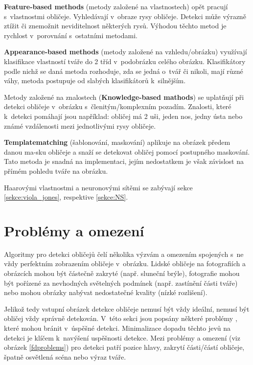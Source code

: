 \textbf{Feature-based methods} (metody založené na vlastnostech) opět pracují s~vlastnostmi obličeje. Vyhledávají v~obraze rysy obličeje. Detekci může výrazně ztížit či znemožnit neviditelnost některých rysů. Výhodou těchto metod je rychlost v~porovnání s~ostatními metodami.

\textbf{Appearance-based methods} (metody založené na vzhledu/obrázku) využívají klasifikace vlastností tváře do 2 tříd v~podobrázku celého obrázku. Klasifikátory podle nichž se daná metoda rozhoduje, zda se jedná o~tvář či nikoli, mají různé váhy, metoda postupuje od slabých klasifikátorů k~silnějším.

Metody založené na znalostech (\textbf{Knowledge-based mathods}) se uplatňují při detekci obličeje v~obrázku s~členitým/komplexním pozadím. Znalosti, které k~detekci pomáhají jsou například: obličej má 2 uši, jeden nos, jedny ústa nebo známé vzdálenosti mezi jednotlivými rysy obličeje.

\textbf{Templatematching} (šablonování, maskování) aplikuje na obrázek předem danou ma-sku obličeje a snaží se detekovat obličej pomocí postupného maskování. Tato metoda je snadná na implementaci, jejím nedostatkem je však závislost na přímém pohledu tváře na obrázku.

Haarovými vlastnostmi a neuronovými sítěmi se zabývají sekce \ref{sekce:viola_jones}, respektive \ref{sekce:NS}.

\section{Problémy a omezení}
\label{sekce:problemy}
Algoritmy pro detekci obličejů čelí několika výzvám a omezením spojených s~ne vždy perfektním zobrazením obličeje v~obrázku. Lidské obličeje na fotografiích a obrázcích mohou být částečně zakryté (např. sluneční brýle), fotografie mohou být pořízené za nevhodných světelných podmínek (např. zastínění části tváře) nebo mohou obrázky nabývat nedostatečné kvality (nízké rozlišení).

Jelikož tedy vstupní obrázek detekce obličeje nemusí být vždy ideální, nemusí být obličej vždy správně detekován.
V~této sekci jsou popsány některé problémy \cite{feature-based-fd-review, fdReview}, které mohou bránit v~úspěšné detekci. Minimalizace dopadu těchto jevů na detekci je klíčem k~navýšení uspěšnosti detekce. Mezi problémy a omezení (viz obrázek \ref{fdproblems}) pro detekci patří pozice hlavy, zakrytí části/částí obličeje, špatně osvětlená scéna nebo výraz tváře.

